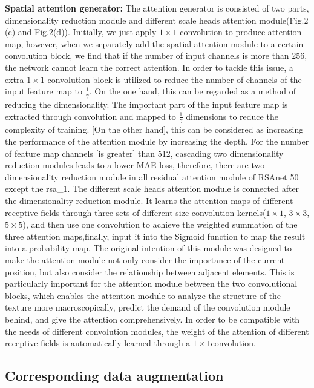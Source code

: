\documentclass{article}
\begin{document}
\textbf{Spatial attention generator:} The attention generator is consisted of two parts, dimensionality reduction module and different scale heads attention module(Fig.2 (c) and Fig.2(d)).
Initially, we just apply $1\times1$ convolution to produce attention map, however, when we separately add the spatial attention module to a certain convolution block, we find that if the number of input channels is more than 256, the network cannot learn the correct attention. In order to tackle this issue, a extra $1\times 1$ convolution block is utilized to reduce the number of channels of the input feature map to $\frac{1}{\gamma}$. On the one hand, this can be regarded as a method of reducing the dimensionality. The important part of the input feature map is extracted through convolution and mapped to $\frac{1}{\gamma}$ dimensions to reduce the complexity of training. [On the other hand], this can be considered as increasing the performance of the attention module by increasing the depth. For the number of feature map channels [is greater] than 512, cascading two dimensionality reduction modules leads to a lower MAE loss, therefore, there are two dimensionality reduction module  in all residual attention module of RSAnet 50 except the rsa\_1.
The different scale heads attention module is connected after the dimensionality reduction module. It learns the attention maps of different receptive fields through three sets of different size convolution kernels($1\times 1$, $3\times 3$, $5\times 5$), and then use one convolution to achieve the weighted summation of the three attention maps,finally, input it into the Sigmoid function to map the result into a probability map. The original intention of this module was designed to make the attention module not only consider the importance of the current position, but also consider the relationship between adjacent elements. This is particularly important for the attention module between the two convolutional blocks, which enables the attention module to analyze the structure of the texture more macroscopically, predict the demand of the convolution module behind, and give the attention comprehensively. In order to be compatible with the needs of different convolution modules, the weight of the attention of different receptive fields is automatically learned through a $1\times1$convolution.

\subsection{Corresponding data augmentation}
\label{ssec:subhead3}
\end{document}
